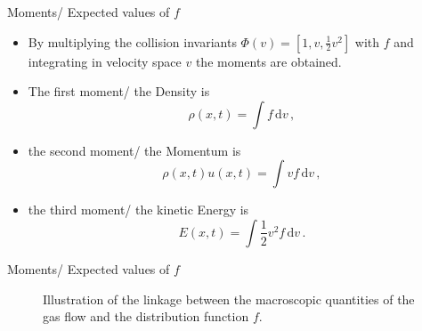\documentclass[Nike]{tuberlinbeamer}
\begin{document}
\begin{frame}[fragile]{Moments/ Expected values of $f$}
	\begin{itemize}
		\item By multiplying the collision invariants $\Phi(v)=[1,v,\frac{1}{2}v^2]$ with $f$ and integrating in velocity space $v$ the moments are obtained.
		\item The first moment/ the Density is
		\begin{equation}
				\rho(x,t) = \int\! f \,\mathrm{d}v \,,
		\end{equation}
		\item the second moment/ the Momentum is
		\begin{equation}
			\rho(x,t) u(x,t) = \int\! v f \,\mathrm{d}v \,,
		\end{equation}
		\item the third moment/ the kinetic Energy is
		\begin{equation}
			E(x,t) = \int\! \frac{1}{2}v^2 f  \,\mathrm{d}v \,.
		\end{equation}
	\end{itemize}
\end{frame}

\begin{frame}[fragile]{Moments/ Expected values of $f$}
	\begin{center}
		\begin{figure}
			
			\caption{Illustration of the linkage between the macroscopic quantities of the gas flow and the distribution function \(f\).}
		\end{figure}
	\end{center}
\end{frame}
\end{document}
